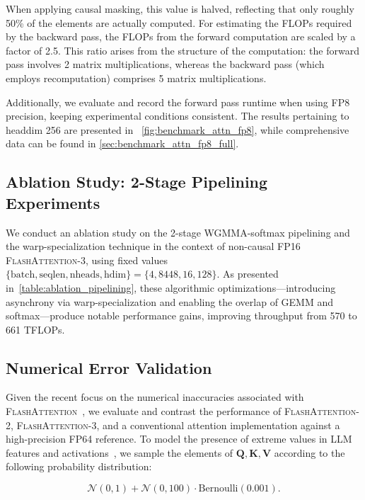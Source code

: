 \begin{algorithm}[H]
\begin{algorithmic}[1]
\begin{itemize}
When applying causal masking, this value is halved, reflecting that only roughly 50\% of the elements are actually computed. For estimating the FLOPs required by the backward pass, the FLOPs from the forward computation are scaled by a factor of 2.5. This ratio arises from the structure of the computation: the forward pass involves 2 matrix multiplications, whereas the backward pass (which employs recomputation) comprises 5 matrix multiplications.

Additionally, we evaluate and record the forward pass runtime when using FP8 precision, keeping experimental conditions consistent. The results pertaining to headdim 256 are presented in ~\cref{fig:benchmark_attn_fp8}, while comprehensive data can be found in \cref{sec:benchmark_attn_fp8_full}.

\subsection{Ablation Study: 2-Stage Pipelining Experiments}
\label{sec:2-stage-pipelining-experiments}

We conduct an ablation study on the 2-stage WGMMA-softmax pipelining and the warp-specialization technique in the context of non-causal FP16 \textsc{FlashAttention-3}, using fixed values $\{\text{batch}, \text{seqlen}, \text{nheads}, \text{hdim}\} = \{ 4, 8448, 16, 128\}$. As presented in~\cref{table:ablation_pipelining}, these algorithmic optimizations—introducing asynchrony via warp-specialization and enabling the overlap of GEMM and softmax—produce notable performance gains, improving throughput from 570 to 661 TFLOPs.

\subsection{Numerical Error Validation}
\label{sec:numerical_error}

Given the recent focus on the numerical inaccuracies associated with \textsc{FlashAttention}~\citep{golden2024flash}, we evaluate and contrast the performance of \textsc{FlashAttention-2}, \textsc{FlashAttention-3}, and a conventional attention implementation against a high-precision FP64 reference. To model the presence of extreme values in LLM features and activations~\citep{dettmers2208llm, sun2024massive}, we sample the elements of $\mathbf{Q}, \mathbf{K}, \mathbf{V}$ according to the following probability distribution:

\begin{equation*}
  \mathcal{N}(0, 1) + \mathcal{N}(0, 100) \cdot \mathrm{Bernoulli}(0.001).
\end{equation*}


\end{itemize}
\end{algorithmic}
\end{algorithm}
